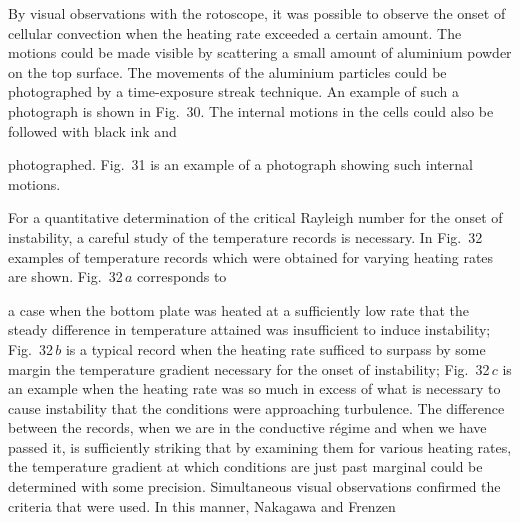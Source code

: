 By visual observations with the rotoscope, it was possible to observe
the onset of cellular convection when the heating rate exceeded a certain
amount.  The motions could be made visible by scattering a small
amount of aluminium powder on the top surface.  The movements of the
aluminium particles could be photographed by a time-exposure streak
technique.  An example of such a photograph is shown in Fig.~30.  The
internal motions in the cells could also be followed with black ink and



\noindent photographed.  Fig.~31 is an example of a photograph showing such
internal motions.

For a quantitative determination of the critical Rayleigh number for
the onset of instability, a careful study of the temperature records is
necessary.  In Fig.~32 examples of temperature records which were
obtained for varying heating rates are shown.  Fig.~32\,$a$ corresponds to


\noindent a case when the bottom plate was heated at a sufficiently low rate that
the steady difference in temperature attained was insufficient to induce
instability; Fig.~32\,$b$ is a typical record when the heating rate sufficed to
surpass by some margin the temperature gradient necessary for the
onset of instability; Fig.~32\,$c$ is an example when the heating rate was so
much in excess of what is necessary to cause instability that the conditions
were approaching turbulence.  The difference between the records, when
we are in the conductive r\'egime and when we have passed it, is sufficiently
striking that by examining them for various heating rates, the tempera\-ture
gradient at which conditions are just past marginal could be deter\-mined
with some precision.  Simultaneous visual observations confirmed
the criteria that were used.  In this manner, Nakagawa and Frenzen

